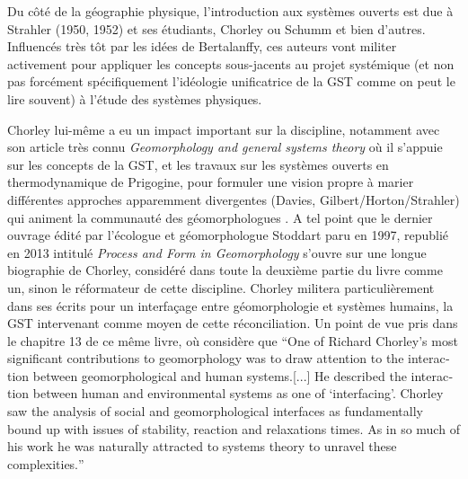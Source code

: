 Du côté de la géographie physique, l'introduction aux systèmes ouverts est due à Strahler (1950, 1952) et ses étudiants, Chorley ou Schumm et bien d'autres. Influencés très tôt par les idées de Bertalanffy, ces auteurs vont militer activement pour appliquer les concepts sous-jacents au projet systémique (et non pas forcément spécifiquement l'idéologie unificatrice de la GST comme on peut le lire souvent) à l'étude des systèmes physiques.

Chorley lui-même a eu un impact important sur la discipline, notamment avec son article très connu \textit{Geomorphology and general systems theory} \autocite{Chorley1962} où il s'appuie sur les concepts de la GST, et les travaux sur les systèmes ouverts en thermodynamique de Prigogine, pour formuler une vision propre à marier différentes approches apparemment divergentes (Davies, Gilbert/Horton/Strahler) qui animent la communauté des géomorphologues \autocite{Stoddart2013, Varenne2014}. A tel point que le dernier ouvrage édité par l'écologue et géomorphologue Stoddart paru en 1997, republié en 2013 intitulé \textit{Process and Form in Geomorphology} \autocite{Stoddart2013} s'ouvre sur une longue biographie de Chorley, considéré dans toute la deuxième partie du livre comme un, sinon le réformateur de cette discipline. Chorley militera particulièrement dans ses écrits pour un interfaçage entre géomorphologie et systèmes humains, la GST intervenant comme moyen de cette réconciliation. Un point de vue pris dans le chapitre 13 de ce même livre, où \autocite{Bennett2013} considère que \foreignquote{english}{One of Richard Chorley's most significant contributions to geomorphology was to draw attention to the interaction between geomorphological and human systems.[...] He described the interaction between human and environmental systems as one of \enquote{interfacing}. Chorley saw the analysis of social and geomorphological interfaces as fundamentally bound up with issues of stability, reaction and relaxations times. As in so much of his work he was naturally attracted to systems theory to unravel these complexities.}

